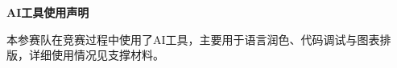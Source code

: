 \newpage
{}
{}
\begin{center}
	{\bfseries AI工具使用声明}
\end{center}


本参赛队在竞赛过程中使用了AI工具，主要用于语言润色、代码调试与图表排版，详细使用情况见支撑材料。

